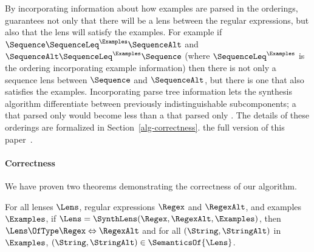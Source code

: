 \documentclass[sigplan,acmsmall]{acmart}
\begin{document}


By incorporating information about how examples are parsed in the
orderings,
\SynthLens{} guarantees not only that there will be a lens between the regular
expressions, but also
that the lens will satisfy the examples.
For example if
$\Sequence \SequenceLeq^{\Examples} \SequenceAlt$ and
$\SequenceAlt \SequenceLeq^{\Examples} \Sequence$ (where
$\SequenceLeq^{\Examples}$ is the ordering incorporating example information)
then there is not only a
sequence lens between $\Sequence$ and $\SequenceAlt$, but there is one that also
satisfies the examples.
Incorporating parse tree information lets the synthesis algorithm differentiate
between previously indistinguishable
subcomponents; a \TextChar{} that parsed only  would become
less than a \TextChar{} that parsed only .  The details of
these orderings are formalized in
\ifappendices
Section~\ref{alg-correctness}.
\else
the full version of this paper~\cite{?}.
\fi

\paragraph*{Correctness}
We have proven two theorems demonstrating the correctness of our algorithm.

\begin{theorem}
  \label{thm:alg-soundness}
  For all lenses $\Lens$, regular expressions $\Regex$ and $\RegexAlt$, and
  examples $\Examples$, 
  if $\Lens = \SynthLens(\Regex,\RegexAlt,\Examples)$, then
  $\Lens \OfType \Regex \Leftrightarrow \RegexAlt$ and for all
  $(\String,\StringAlt)$ in $\Examples$, $(\String,\StringAlt) \in
  \SemanticsOf{\Lens}$.
\end{theorem}
\end{document}
